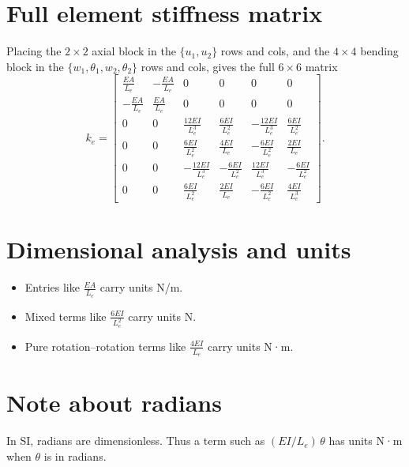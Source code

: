\documentclass{article}
\begin{document}
	\section{Full element stiffness matrix}
	Placing the \(2\times2\) axial block in the \(\{u_1,u_2\}\) rows and cols,
	and the \(4\times4\) bending block in the \(\{w_1,\theta_1,w_2,\theta_2\}\) rows and cols,
	gives the full \(6\times6\) matrix
	\[
	k_e =
	\begin{bmatrix}
		\frac{EA}{L_e}           & -\frac{EA}{L_e}          & 0               & 0                          & 0                         & 0           \\[6pt]
		-\frac{EA}{L_e}          &  \frac{EA}{L_e}          & 0               & 0                          & 0                         & 0           \\[6pt]
		0                        &  0                        & \tfrac{12EI}{L_e^3} & \tfrac{6EI}{L_e^2}         & -\tfrac{12EI}{L_e^3}      &  \tfrac{6EI}{L_e^2} \\[6pt]
		0                        &  0                        & \tfrac{6EI}{L_e^2}  & \tfrac{4EI}{L_e}           & -\tfrac{6EI}{L_e^2}       &  \tfrac{2EI}{L_e}   \\[6pt]
		0                        &  0                        & -\tfrac{12EI}{L_e^3} & -\tfrac{6EI}{L_e^2}        &  \tfrac{12EI}{L_e^3}      & -\tfrac{6EI}{L_e^2} \\[6pt]
		0                        &  0                        & \tfrac{6EI}{L_e^2}  & \tfrac{2EI}{L_e}           & -\tfrac{6EI}{L_e^2}       &  \tfrac{4EI}{L_e^3}
	\end{bmatrix}.
	\]
	
	\section{Dimensional analysis and units}
	\begin{itemize}
		\item Entries like \(\tfrac{EA}{L_e}\) carry units N/m.
		\item Mixed terms like \(\tfrac{6EI}{L_e^2}\) carry units N.
		\item Pure rotation–rotation terms like \(\tfrac{4EI}{L_e}\) carry units N·m.
	\end{itemize}
	
	\section{Note about radians}
	In SI, radians are dimensionless.  Thus a term such as
	\((EI/L_e)\,\theta\) has units N·m when \(\theta\) is in radians.
	
\end{document}
